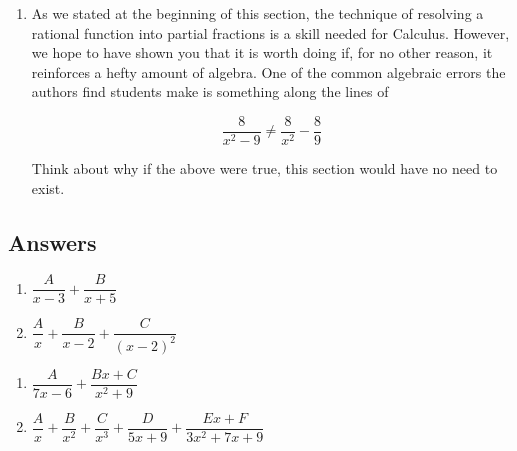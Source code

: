 \begin{enumerate}
\setcounter{enumi}{\value{HW}}

\item As we stated at the beginning of this section, the technique of resolving a rational function into partial fractions is a skill needed for Calculus.  However, we hope to have shown you that it is worth doing if, for no other reason, it reinforces a hefty amount of algebra.  One of the common algebraic errors the authors find students make is something along the lines of 

\[ \dfrac{8}{x^2 - 9} \neq \dfrac{8}{x^2} - \dfrac{8}{9}\]

Think about  why if the above were true, this section would have no need to exist.

\end{enumerate}

\newpage

\subsection{Answers}

\begin{multicols}{2}
\begin{enumerate}

\item $\dfrac{A}{x - 3} + \dfrac{B}{x + 5}$
\item $\dfrac{A}{x} + \dfrac{B}{x - 2} + \dfrac{C}{(x - 2)^{2}}$

\setcounter{HW}{\value{enumi}}
\end{enumerate}
\end{multicols}

\begin{multicols}{2}
\begin{enumerate}
\setcounter{enumi}{\value{HW}}

\item $\dfrac{A}{7x - 6} + \dfrac{Bx + C}{x^{2} + 9}$
\item $\dfrac{A}{x} + \dfrac{B}{x^{2}} + \dfrac{C}{x^{3}} + \dfrac{D}{5x + 9} + \dfrac{Ex + F}{3x^{2} + 7x + 9}$

\setcounter{HW}{\value{enumi}}
\end{enumerate}
\end{multicols}

